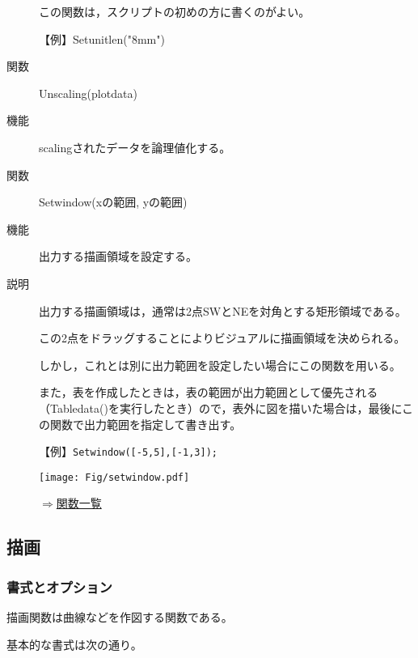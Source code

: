 \documentclass[papersize,a4paper,10pt,uplatex]{jsarticle}
\begin{document}
\begin{description}
この関数は，スクリプトの初めの方に書くのがよい。

【例】Setunitlen("8mm")

\vspace{\baselineskip}

\hypertarget{unscaling}{}
\item[関数]Unscaling(plotdata)
\item[機能]scalingされたデータを論理値化する。

\vspace{\baselineskip}
\hypertarget{setwindow}{}
\item[関数]Setwindow(xの範囲, yの範囲)
\item[機能]出力する描画領域を設定する。
\item[説明]出力する描画領域は，通常は2点SWとNEを対角とする矩形領域である。

この2点をドラッグすることによりビジュアルに描画領域を決められる。

しかし，これとは別に出力範囲を設定したい場合にこの関数を用いる。

また，表を作成したときは，表の範囲が出力範囲として優先される（Tabledata()を実行したとき）ので，表外に図を描いた場合は，最後にこの関数で出力範囲を指定して書き出す。

\vspace{\baselineskip}
【例】\verb|Setwindow([-5,5],[-1,3]);|

\vspace{\baselineskip}
\hspace{10mm}\texttt{[image: Fig/setwindow.pdf]} 

\begin{flushright}\hyperlink{functionlist}{$\Rightarrow$関数一覧}\end{flushright}

\end{description}

\subsection{描画}
\subsubsection{書式とオプション}

描画関数は曲線などを作図する関数である。

基本的な書式は次の通り。
\end{document}
